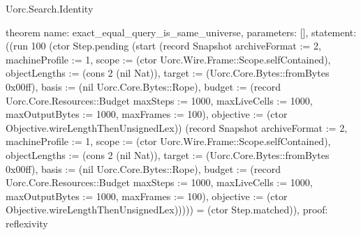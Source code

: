 \begin{lexlean}{Uorc.Search.Identity}
\begin{semanticmodule}
theorem{
  name: exact_equal_query_is_same_universe,
  parameters: [],
  statement: ((run 100 (ctor Step.pending (start (record Snapshot {archiveFormat := 2, machineProfile := 1, scope := (ctor Uorc.Wire.Frame::Scope.selfContained), objectLengths := (cons 2 (nil Nat)), target := (Uorc.Core.Bytes::fromBytes 0x00ff), basis := (nil Uorc.Core.Bytes::Rope), budget := (record Uorc.Core.Resources::Budget {maxSteps := 1000, maxLiveCells := 1000, maxOutputBytes := 1000, maxFrames := 100}), objective := (ctor Objective.wireLengthThenUnsignedLex)}) (record Snapshot {archiveFormat := 2, machineProfile := 1, scope := (ctor Uorc.Wire.Frame::Scope.selfContained), objectLengths := (cons 2 (nil Nat)), target := (Uorc.Core.Bytes::fromBytes 0x00ff), basis := (nil Uorc.Core.Bytes::Rope), budget := (record Uorc.Core.Resources::Budget {maxSteps := 1000, maxLiveCells := 1000, maxOutputBytes := 1000, maxFrames := 100}), objective := (ctor Objective.wireLengthThenUnsignedLex)})))) = (ctor Step.matched)),
  proof: reflexivity{}
}
\end{semanticmodule}
\end{lexlean}

